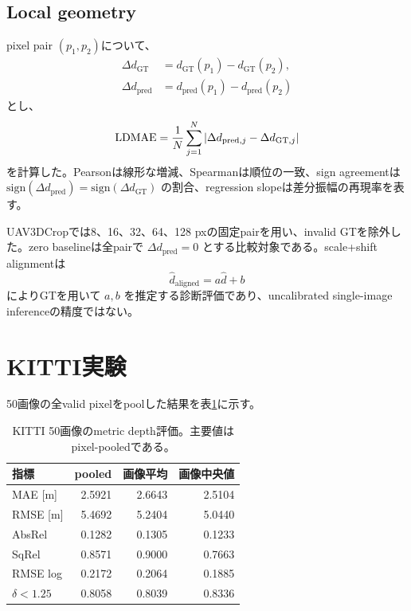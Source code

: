 \documentclass[a4paper,11pt]{ltjsarticle}
\begin{document}
\subsection{Local geometry}
pixel pair $(p_1,p_2)$について、
\begin{align}
\Delta d_{\mathrm{GT}}&=d_{\mathrm{GT}}(p_1)-d_{\mathrm{GT}}(p_2),\\
\Delta d_{\mathrm{pred}}&=d_{\mathrm{pred}}(p_1)-d_{\mathrm{pred}}(p_2)
\end{align}
とし、
\begin{equation}
\mathrm{LD\-MAE}=\frac{1}{N}\sum_{j=1}^{N}|\Delta d_{\mathrm{pred},j}-\Delta d_{\mathrm{GT},j}|
\end{equation}
を計算した。Pearsonは線形な増減、Spearmanは順位の一致、sign agreementは $\mathrm{sign}(\Delta d_{\mathrm{pred}})=\mathrm{sign}(\Delta d_{\mathrm{GT}})$ の割合、regression slopeは差分振幅の再現率を表す。

UAV3DCropでは8、16、32、64、128 pxの固定pairを用い、invalid GTを除外した。zero baselineは全pairで $\Delta d_{\mathrm{pred}}=0$ とする比較対象である。scale+shift alignmentは
\begin{equation}
\hat{d}_{\mathrm{aligned}}=a\hat{d}+b
\end{equation}
によりGTを用いて $a,b$ を推定する診断評価であり、uncalibrated single-image inferenceの精度ではない。

\section{KITTI実験}
50画像の全valid pixelをpoolした結果を表\ref{tab:kitti}に示す。
\begin{table}[H]\centering
\caption{KITTI 50画像のmetric depth評価。主要値はpixel-pooledである。}
\label{tab:kitti}
\begin{tabular}{lrrr}\toprule
指標 & pooled & 画像平均 & 画像中央値\\\midrule
MAE [m] & 2.5921 & 2.6643 & 2.5104\\
RMSE [m] & 5.4692 & 5.2404 & 5.0440\\
AbsRel & 0.1282 & 0.1305 & 0.1233\\
SqRel & 0.8571 & 0.9000 & 0.7663\\
RMSE log & 0.2172 & 0.2064 & 0.1885\\
$\delta<1.25$ & 0.8058 & 0.8039 & 0.8336\\\bottomrule
\end{tabular}\end{table}
\end{document}
